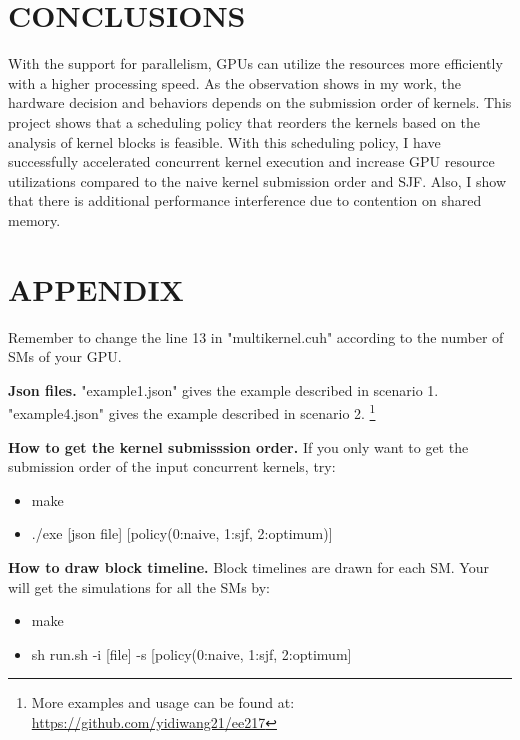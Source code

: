 \documentclass[conference]{IEEEtran}
\begin{document}
\section{CONCLUSIONS}
With the support for parallelism, GPUs can utilize the resources more efficiently with a higher processing speed. As the observation shows in my work, the hardware decision and behaviors depends on the submission order of kernels. This project shows that a scheduling policy that reorders the kernels based on the analysis of kernel blocks is feasible. With this scheduling policy, I have successfully accelerated concurrent kernel execution and increase GPU resource utilizations compared to the naive kernel submission order and SJF. Also, I show that there is additional performance interference due to contention on shared memory.

\section*{APPENDIX}
Remember to change the line 13 in "multikernel.cuh" according to the number of SMs of your GPU.

\textbf{Json files.}
"example1.json" gives the example described in scenario 1. "example4.json" gives the example described in scenario 2. 
\footnote{More examples and usage can be found at:\\ \url{https://github.com/yidiwang21/ee217}}

\textbf{How to get the kernel submisssion order.}
If you only want to get the submission order of the input concurrent kernels, try: 
\begin{itemize}
   \item make
   \item ./exe [json file] [policy(0:naive, 1:sjf,  2:optimum)]
\end{itemize}

\textbf{How to draw block timeline.} Block timelines are drawn for each SM. Your will get the simulations for all the SMs by:
\begin{itemize}
   \item make
   \item sh run.sh -i [file] -s [policy(0:naive, 1:sjf, 2:optimum]
\end{itemize}
\end{document}
